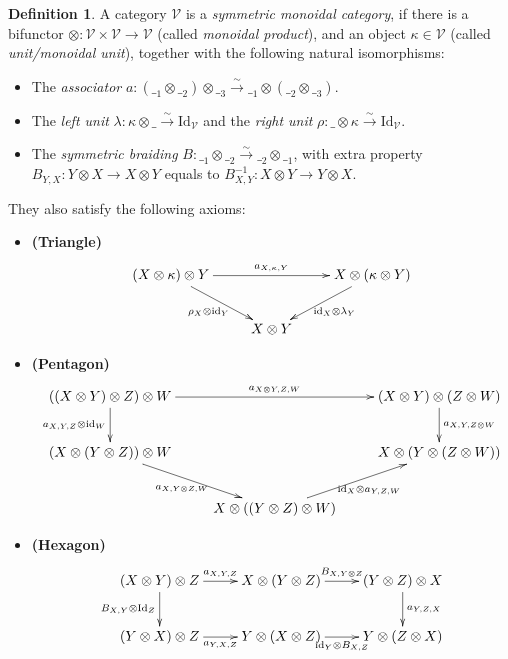 \documentclass[openany, amssymb, psamsfonts]{amsart}
\theoremstyle{definition}
\newtheorem{defn}{Definition}[section]
\numberwithin{equation}{section}
\newcommand{\id}{\mathrm{id}} %
\newcommand{\Id}{\mathrm{Id}} %
\newcommand{\tensor}{\otimes} %
\begin{document}
\begin{defn}\label{defn_symmon}
    A category $\mathcal{V}$ is a \emph{symmetric monoidal category}, if there is a bifunctor $\tensor:\mathcal{V}\times\mathcal{V}\rightarrow\mathcal{V}$ (called \emph{monoidal product}), and an object $\kappa\in\mathcal{V}$ (called \emph{unit/monoidal unit}), together with the following natural isomorphisms:
    \begin{itemize}
        \item The \emph{associator} $a:(\_ _1\tensor \_ _2)\tensor \_ _3 \xrightarrow{\sim} \_ _1\tensor(\_ _2\tensor \_ _3)$.
        \item The \emph{left unit} $\lambda:\kappa\tensor\_\xrightarrow{\sim} \Id_{\mathcal{V}}$ and the \emph{right unit} $\rho:\_\tensor \kappa\xrightarrow{\sim}\Id_\mathcal{V}$.
        \item The \emph{symmetric braiding} $B:\_ _1\tensor\_ _2\xrightarrow{\sim}\_ _2\tensor\_ _1$, with extra property $B_{Y,X}:Y\tensor X\rightarrow X\tensor Y$ equals to $B_{X,Y}^{-1}:X\tensor Y\rightarrow Y\tensor X$.
    \end{itemize} 

    They also satisfy the following axioms:
    \begin{itemize}
        \item \textbf{(Triangle)}
        \[\xymatrix{
            (X\tensor \kappa)\tensor Y \ar[dr]_-{\rho_X \tensor \id_Y} \ar[rr]^-{a_{X,\kappa,Y}} && X\tensor (\kappa\tensor Y) \ar[dl]^-{\id_X\tensor \lambda_Y}\\
            & X\tensor Y
        }\]
        \item \textbf{(Pentagon)}
        \[\xymatrix{
            ((X\tensor Y)\tensor Z)\tensor W \ar[rr]^-{a_{X\tensor Y,Z,W}} \ar[d]_-{a_{X,Y,Z}\tensor \id_W} && (X\tensor Y)\tensor(Z\tensor W) \ar[d]^-{a_{X,Y,Z\tensor W}}\\
            (X\tensor (Y\tensor Z))\tensor W \ar[dr]_-{a_{X,Y\tensor Z,W}} && X\tensor (Y\tensor (Z\tensor W)) \\
            & X\tensor ((Y\tensor Z)\tensor W) \ar[ur]_-{\id_X\tensor a_{Y,Z,W}}
        }\]
        \item \textbf{(Hexagon)}
        \[\xymatrix{
            (X\tensor Y)\tensor Z \ar[r]^-{a_{X,Y,Z}} \ar[d]_-{B_{X,Y}\tensor \Id_Z} & X\tensor (Y\tensor Z)\ar[r]^-{B_{X,Y\tensor Z}} & (Y\tensor Z)\tensor X \ar[d]^-{a_{Y,Z,X}}\\
            (Y\tensor X)\tensor Z \ar[r]_-{a_{Y,X,Z}} & Y\tensor (X\tensor Z) \ar[r]_-{\id_Y\tensor B_{X,Z}} & Y\tensor (Z\tensor X)
        }\]
    \end{itemize}
\end{defn}
\end{document}

